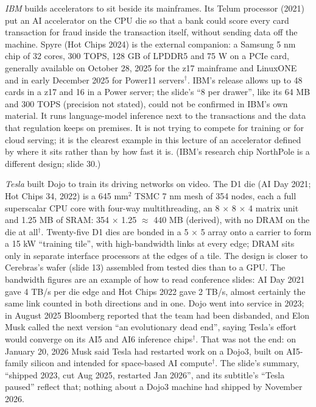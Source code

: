 \documentclass[11pt,letterpaper]{article}
\begin{document}
\emph{IBM} builds accelerators to sit beside its mainframes. Its Telum processor (2021) put an AI accelerator on the CPU die so that a bank could score every card transaction for fraud inside the transaction itself, without sending data off the machine. Spyre (Hot Chips 2024) is the external companion: a Samsung 5 nm chip of 32 cores, 300 TOPS, 128 GB of LPDDR5 and 75 W on a PCIe card, generally available on October 28, 2025 for the z17 mainframe and LinuxONE and in early December 2025 for Power11 servers$^\dagger$. IBM's release allows up to 48 cards in a z17 and 16 in a Power server; the slide's ``8 per drawer'', like its 64 MB and 300 TOPS (precision not stated), could not be confirmed in IBM's own material. It runs language-model inference next to the transactions and the data that regulation keeps on premises. It is not trying to compete for training or for cloud serving; it is the clearest example in this lecture of an accelerator defined by where it sits rather than by how fast it is. (IBM's research chip NorthPole is a different design; slide 30.)

\emph{Tesla} built Dojo to train its driving networks on video. The D1 die (AI Day 2021; Hot Chips 34, 2022) is a 645 mm$^2$ TSMC 7 nm mesh of 354 nodes, each a full superscalar CPU core with four-way multithreading, an 8 $\times$ 8 $\times$ 4 matrix unit and 1.25 MB of SRAM: 354 $\times$ 1.25 $\approx$ 440 MB (derived), with no DRAM on the die at all$^\dagger$. Twenty-five D1 dies are bonded in a 5 $\times$ 5 array onto a carrier to form a 15 kW ``training tile'', with high-bandwidth links at every edge; DRAM sits only in separate interface processors at the edges of a tile. The design is closer to Cerebras's wafer (slide 13) assembled from tested dies than to a GPU. The bandwidth figures are an example of how to read conference slides: AI Day 2021 gave 4 TB/s per die edge and Hot Chips 2022 gave 2 TB/s, almost certainly the same link counted in both directions and in one. Dojo went into service in 2023; in August 2025 Bloomberg reported that the team had been disbanded, and Elon Musk called the next version ``an evolutionary dead end'', saying Tesla's effort would converge on its AI5 and AI6 inference chips$^\dagger$. That was not the end: on January 20, 2026 Musk said Tesla had restarted work on a Dojo3, built on AI5-family silicon and intended for space-based AI compute$^\dagger$. The slide's summary, ``shipped 2023, cut Aug 2025, restarted Jan 2026'', and its subtitle's ``Tesla paused'' reflect that; nothing about a Dojo3 machine had shipped by November 2026.
\end{document}
